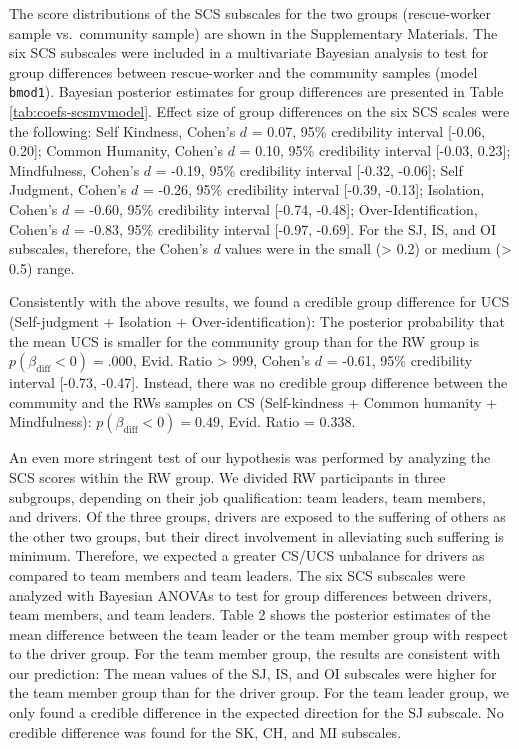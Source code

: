 \documentclass[
  man]{apa7}
\begin{document}
The score distributions of the SCS subscales for the two groups (rescue-worker sample vs.~community sample) are shown in the Supplementary Materials. The six SCS subscales were included in a multivariate Bayesian analysis to test for group differences between rescue-worker and the community samples (model \texttt{bmod1}). Bayesian posterior estimates for group differences are presented in Table \ref{tab:coefs-scsmvmodel}. Effect size of group differences on the six SCS scales were the following: Self Kindness, Cohen's \(d\) = 0.07, 95\% credibility interval {[}-0.06, 0.20{]}; Common Humanity, Cohen's \(d\) = 0.10, 95\% credibility interval {[}-0.03, 0.23{]}; Mindfulness, Cohen's \(d\) = -0.19, 95\% credibility interval {[}-0.32, -0.06{]}; Self Judgment, Cohen's \(d\) = -0.26, 95\% credibility interval {[}-0.39, -0.13{]}; Isolation, Cohen's \(d\) = -0.60, 95\% credibility interval {[}-0.74, -0.48{]}; Over-Identification, Cohen's \(d\) = -0.83, 95\% credibility interval {[}-0.97, -0.69{]}. For the SJ, IS, and OI subscales, therefore, the Cohen's \emph{d} values were in the small (\textgreater{} 0.2) or medium (\textgreater{} 0.5) range.

Consistently with the above results, we found a credible group difference for UCS (Self-judgment + Isolation + Over-identification): The posterior probability that the mean UCS is smaller for the community group than for the RW group is \(p(\beta_{\text{diff}} < 0) = .000\), Evid. Ratio \textgreater{} 999, Cohen's \(d\) = -0.61, 95\% credibility interval {[}-0.73, -0.47{]}. Instead, there was no credible group difference between the community and the RWs samples on CS (Self-kindness + Common humanity + Mindfulness): \(p(\beta_{\text{diff}} < 0) = 0.49\), Evid. Ratio = 0.338.

An even more stringent test of our hypothesis was performed by analyzing the SCS scores within the RW group. We divided RW participants in three subgroups, depending on their job qualification: team leaders, team members, and drivers. Of the three groups, drivers are exposed to the suffering of others as the other two groups, but their direct involvement in alleviating such suffering is minimum. Therefore, we expected a greater CS/UCS unbalance for drivers as compared to team members and team leaders.
The six SCS subscales were analyzed with Bayesian ANOVAs to test for group differences between drivers, team members, and team leaders. Table 2 shows the posterior estimates of the mean difference between the team leader or the team member group with respect to the driver group. For the team member group, the results are consistent with our prediction: The mean values of the SJ, IS, and OI subscales were higher for the team member group than for the driver group. For the team leader group, we only found a credible difference in the expected direction for the SJ subscale. No credible difference was found for the SK, CH, and MI subscales.
\end{document}
